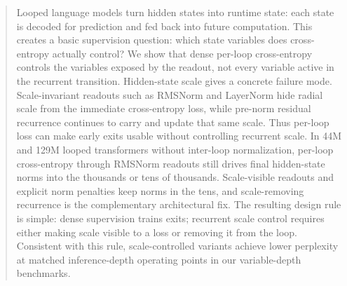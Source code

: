 \begin{abstract}
Looped language models turn hidden states into runtime state: each state is decoded for prediction and fed back into future computation.
This creates a basic supervision question: which state variables does cross-entropy actually control?
We show that dense per-loop cross-entropy controls the variables exposed by the readout, not every variable active in the recurrent transition.
Hidden-state scale gives a concrete failure mode.
Scale-invariant readouts such as RMSNorm and LayerNorm hide radial scale from the immediate cross-entropy loss, while pre-norm residual recurrence continues to carry and update that same scale.
Thus per-loop loss can make early exits usable without controlling recurrent scale.
In 44M and 129M looped transformers without inter-loop normalization, per-loop cross-entropy through RMSNorm readouts still drives final hidden-state norms into the thousands or tens of thousands.
Scale-visible readouts and explicit norm penalties keep norms in the tens, and scale-removing recurrence is the complementary architectural fix.
The resulting design rule is simple: dense supervision trains exits; recurrent scale control requires either making scale visible to a loss or removing it from the loop.
Consistent with this rule, scale-controlled variants achieve lower perplexity at matched inference-depth operating points in our variable-depth benchmarks.
\end{abstract}
